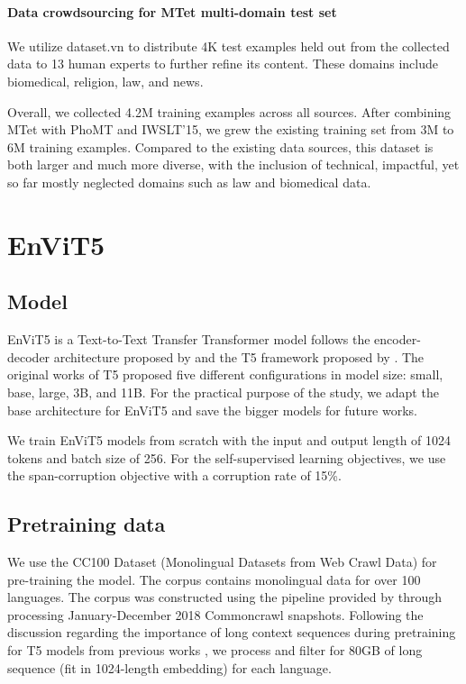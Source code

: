 \documentclass[11pt]{article}
\begin{document}
\paragraph{Data crowdsourcing for MTet multi-domain test set} We utilize dataset.vn to distribute 4K test examples held out from the collected data to 13 human experts to further refine its content. These domains include biomedical, religion, law, and news. 


Overall, we collected 4.2M training examples across all sources. After combining MTet with PhoMT and IWSLT'15, we grew the existing training set from 3M to 6M training examples. Compared to the existing data sources, this dataset is both larger and much more diverse, with the inclusion of technical, impactful, yet so far mostly neglected domains such as law and biomedical data. 
 
\section{EnViT5}
\subsection{Model}
EnViT5 is a Text-to-Text Transfer Transformer model follows the encoder-decoder architecture proposed by \cite{vaswani2017attention} and the T5 framework proposed by \cite{t5}. The original works of T5 proposed five different configurations in model size: small, base, large, 3B, and 11B. For the practical purpose of the study, we adapt the base architecture for EnViT5 and save the bigger models for future works. 

We train EnViT5 models from scratch with the input and output length of 1024 tokens and batch size of 256. 
For the self-supervised learning objectives, we use the span-corruption objective with a corruption rate of 15\%.

\subsection{Pretraining data}
\label{sec:pretraindata}
We use the CC100 Dataset (Monolingual Datasets from Web Crawl Data) \cite{ccnet} for pre-training the model. The corpus contains monolingual data for over 100 languages. The corpus was constructed using the pipeline provided by \cite{ccnet} through processing January-December 2018 Commoncrawl snapshots.
Following the discussion regarding the importance of long context sequences during pretraining for T5 models from previous works \cite{vit5}, we process and filter for 80GB of long sequence (fit in 1024-length embedding) for each language. 
\end{document}

